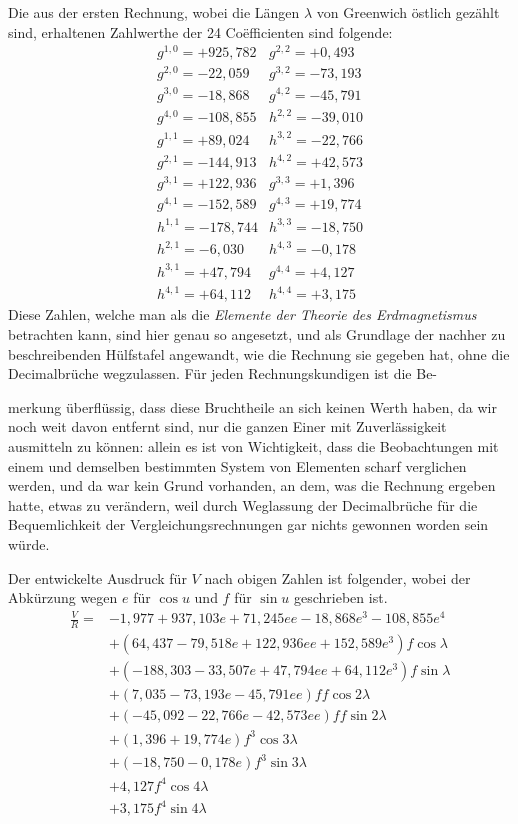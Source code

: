 Die aus der ersten Rechnung, wobei die Längen $\lambda$ von Greenwich östlich gezählt sind, erhaltenen Zahlwerthe der 24 Coëfficienten sind folgende:
\[
\begin{array}{r|r}
g^{1,0}=+925{,}782&g^{2,2}=+0{,}493\\
g^{2,0}=-22{,}059&g^{3,2}=-73{,}193\\
g^{3,0}=-18{,}868&g^{4,2}=-45{,}791\\
g^{4,0}=-108{,}855&h^{2,2}=-39{,}010\\
g^{1,1}=+89{,}024&h^{3,2}=-22{,}766\\
g^{2,1}=-144{,}913&h^{4,2}=+42{,}573\\
g^{3,1}=+122{,}936&g^{3,3}=+1{,}396\\
g^{4,1}=-152{,}589&g^{4,3}=+19{,}774\\
h^{1,1}=-178{,}744&h^{3,3}=-18{,}750\\
h^{2,1}=-6{,}030&h^{4,3}=-0{,}178\\
h^{3,1}=+47{,}794&g^{4,4}=+4{,}127\\
h^{4,1}=+64{,}112&h^{4,4}=+3{,}175
\end{array}
\]
Diese Zahlen, welche man als die \textit{Elemente der Theorie des Erdmagnetismus} betrachten kann, sind hier genau so angesetzt, und als Grundlage der nachher zu beschreibenden Hülfstafel angewandt, wie die Rechnung sie gegeben hat, ohne die Decimalbrüche wegzulassen. Für jeden Rechnungskundigen ist die Be-
\par\clearpage
{}
\noindent merkung überflüssig, dass diese Bruchtheile an sich keinen Werth haben, da wir noch weit davon entfernt sind, nur die ganzen Einer mit Zuverlässigkeit ausmitteln zu können: allein es ist von Wichtigkeit, dass die Beobachtungen mit einem und demselben bestimmten System von Elementen scharf verglichen werden, und da war kein Grund vorhanden, an dem, was die Rechnung ergeben hatte, etwas zu verändern, weil durch Weglassung der Decimalbrüche für die Bequemlichkeit der Vergleichungsrechnungen gar nichts gewonnen worden sein würde.

Der entwickelte Ausdruck für $V$ nach obigen Zahlen ist folgender, wobei der Abkürzung wegen $e$ für $\cos u$ und $f$ für $\sin u$ geschrieben ist.
\[
\begin{aligned}
\frac VR={}&-1{,}977+937{,}103e+71{,}245ee-18{,}868e^3-108{,}855e^4\\
&+(64{,}437-79{,}518e+122{,}936ee+152{,}589e^3)f\cos\lambda\\
&+(-188{,}303-33{,}507e+47{,}794ee+64{,}112e^3)f\sin\lambda\\
&+(7{,}035-73{,}193e-45{,}791ee)ff\cos2\lambda\\
&+(-45{,}092-22{,}766e-42{,}573ee)ff\sin2\lambda\\
&+(1{,}396+19{,}774e)f^3\cos3\lambda\\
&+(-18{,}750-0{,}178e)f^3\sin3\lambda\\
&+4{,}127f^4\cos4\lambda\\
&+3{,}175f^4\sin4\lambda
\end{aligned}
\]

